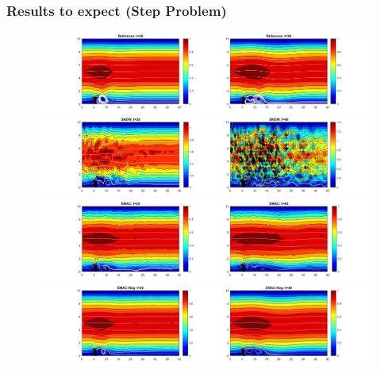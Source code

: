 \documentclass{beamer}
\begin{document}

\begin{frame}
\frametitle{Results to expect (Step Problem)}
\begin{figure}
\includegraphics[scale=.13]{step_Skew_fine.jpg}
\includegraphics[scale=.13]{step_skew_coarse.jpg}
\includegraphics[scale=.13]{step_EMAC_coarse.jpg}
\includegraphics[scale=.13]{step_EMAC_Reg_coarse.jpg}
\end{figure}

\end{frame}

\end{document}
